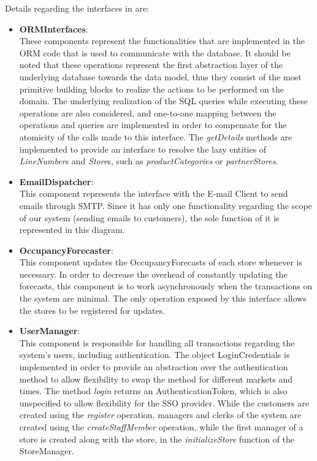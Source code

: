 Details regarding the interfaces in  are:
\begin{itemize}
    \item \textbf{ORMInterfaces}: \\
    These components represent the functionalities that are implemented in the ORM code that is used to communicate with the database.
    It should be noted that these operations represent the first abstraction layer of the underlying database towards the data model, thus they consist of the most primitive building blocks to realize the actions to be performed on the domain.
    The underlying realization of the SQL queries while executing these operations are also considered, and one-to-one mapping between the operations and queries are implemented in order to compensate for the atomicity of the calls made to this interface.
    The \textit{getDetails} methods are implemented to provide an interface to resolve the lazy entities of \textit{LineNumber}s and \textit{Store}s, such as \textit{productCategories} or \textit{partnerStores}.
    \item \textbf{EmailDispatcher}: \\
    This component represents the interface with the E-mail Client to send emails through SMTP.
    Since it has only one functionality regarding the scope of our system (sending emails to customers), the sole function of it is represented in this diagram.
    \item \textbf{OccupancyForecaster}: \\
    This component updates the OccupancyForecasts of each store whenever is necessary.
    In order to decrease the overhead of constantly updating the forecasts, this component is to work asynchronously when the transactions on the system are minimal.
    The only operation exposed by this interface allows the stores to be registered for updates.
    \item \textbf{UserManager}: \\
    This component is responsible for handling all transactions regarding the system's users, including authentication.
    The object LoginCredentials is implemented in order to provide an abstraction over the authentication method to allow flexibility to swap the method for different markets and times.
    The method \textit{login} returns an AuthenticationToken, which is also unspecified to allow flexibility for the SSO provider.
    While the customers are created using the \textit{register} operation, managers and clerks of the system are created using the \textit{createStaffMember} operation, while the first manager of a store is created along with the store, in the \textit{initializeStore} function of the StoreManager.

\end{itemize}
